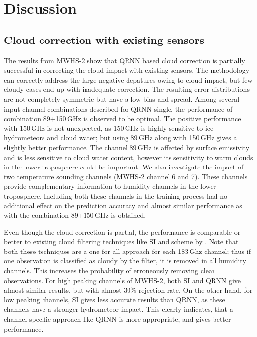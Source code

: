 \documentclass[amt, manuscript]{copernicus}
\begin{document}
\section{Discussion}
\label{discussions}

\subsection{Cloud correction with existing sensors}
%
The results from MWHS-2 show that QRNN based cloud correction is partially successful in correcting the cloud impact with existing sensors. The methodology can correctly address the large negative depatures owing to cloud impact, but few cloudy cases end up with inadequate correction. The resulting error distributions are not completely symmetric but have a low bias and spread. Among several input channel combinations described for QRNN-single, the performance of combination 89+150\,GHz is observed to be optimal. The positive performance with 150\,GHz is not unexpected, as 150\,GHz is highly sensitive to ice hydrometeors and cloud water; but using 89\,GHz along with 150\,GHz gives a slightly better performance. The channel 89\,GHz is affected by surface emissivity and is less sensitive to cloud water content, however its sensitivity to warm clouds in the lower troposphere could be important. We also investigate the impact of two temperature sounding channels (MWHS-2 channel 6 and 7). These channels provide complementary information to humidity channels in the lower troposphere. Including both these channels in the training process had no additional effect on the prediction accuracy and almost similar performance as with the combination 89+150\,GHz is obtained. 

Even though the cloud correction is partial, the performance is comparable or better to existing cloud filtering techniques like SI and scheme by \cite{buehler:aclou:07}. Note that both these techniques are a one for all approach for each 183\,Ghz channel; thus if one observation is classified as cloudy by the filter, it is removed in all humidity channels. This increases the probability of erroneously removing clear observations. For high peaking channels of MWHS-2, both SI and QRNN give almost similar results, but with almost 30\% rejection rate. On the other hand, for low peaking channels, SI gives less accurate results than QRNN, as these channels have a stronger hydrometeor impact. This clearly indicates, that a channel specific approach like QRNN is more appropriate, and gives better performance. 
\end{document}
